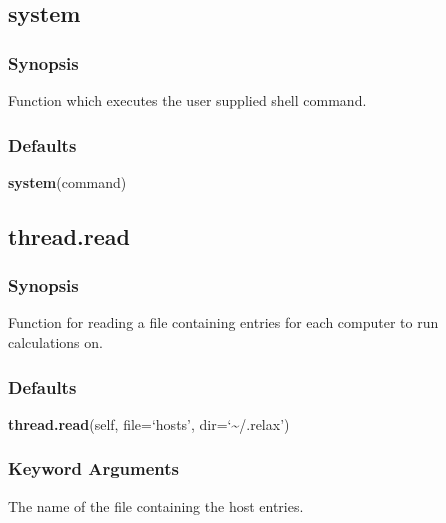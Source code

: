 

  

 \newpage 

 \subsection{system} 

  
 \subsubsection{Synopsis} 

 Function which executes the user supplied shell command. 
  

  
 \subsubsection{Defaults} 

 \textsf{\textbf{system}(command)} 

  

 \newpage 

 \subsection{thread.read} 

  
 \subsubsection{Synopsis} 

 Function for reading a file containing entries for each computer to run calculations on. 
  

  
 \subsubsection{Defaults} 

 \textsf{\textbf{thread.read}(self, file=`hosts', dir=`\~{}/.relax')} 

  
 \subsubsection{Keyword Arguments} 

   The name of the file containing the host entries.   

